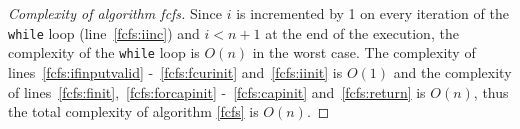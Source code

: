 \begin{proof}[Complexity of algorithm fcfs]
   Since $i$ is incremented by 1 on every iteration of the \texttt{while} loop (line~\ref{fcfs:iinc}) and $i < n+1$ at the
   end of the execution, the complexity of the \texttt{while} loop is $O(n)$ in the worst case. The complexity of
   lines~\ref{fcfs:ifinputvalid} -~\ref{fcfs:fcurinit} and~\ref{fcfs:iinit} is $O(1)$ and the complexity of
   lines~\ref{fcfs:finit},~\ref{fcfs:forcapinit} -~\ref{fcfs:capinit} and~\ref{fcfs:return} is $O(n)$, thus the total
   complexity of algorithm \ref{fcfs} is $O(n)$.
\end{proof}

